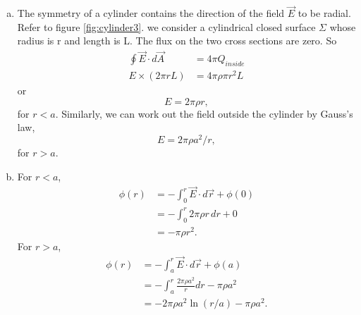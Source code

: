 \documentclass{esg8022pset}
\begin{document}
\begin{solution}
  \begin{enumerate}[(a)]
    \item The symmetry of a cylinder contains the direction of the field
      $\vec{E}$ to be radial.  Refer to figure \ref{fig:cylinder3}.  we
      consider a cylindrical closed surface $\Sigma$ whose radius is r and
      length is L.  The flux on the two cross sections are zero.  So
      \begin{align*}
        \oint \vec{E}\cdot d\vec{A} & = 4\pi Q_{inside}\\
        E\times(2\pi rL) & = 4\pi\rho\pi r^2L
      \end{align*}
      or
      \begin{equation*}
      E=2\pi\rho r,
      \end{equation*}
      for $r<a$.  Similarly, we can work out the field outside the cylinder
      by Gauss's law,
      \begin{equation*}
      E=2\pi\rho a^2/r,
      \end{equation*}
      for $r>a$.
    \item For $r<a$, 
      \begin{align*}
        \phi(r) & = -\int_0^r\vec{E}\cdot d\vec{r}+\phi(0)\\
                & = -\int_0^r 2\pi\rho r\,dr+0\\
                & = -\pi\rho r^2.
      \end{align*}
      For $r>a$,
      \begin{align*}
        \phi(r) & = -\int_a^r \vec{E}\cdot d\vec{r}+\phi(a)\\
                & = -\int_a^r\frac{2\pi\rho a^2}{r}dr-\pi\rho a^2\\
                & = -2\pi\rho a^2\ln{(r/a)}-\pi\rho a^2.
      \end{align*}
  \end{enumerate}
\end{solution}
\end{document}
